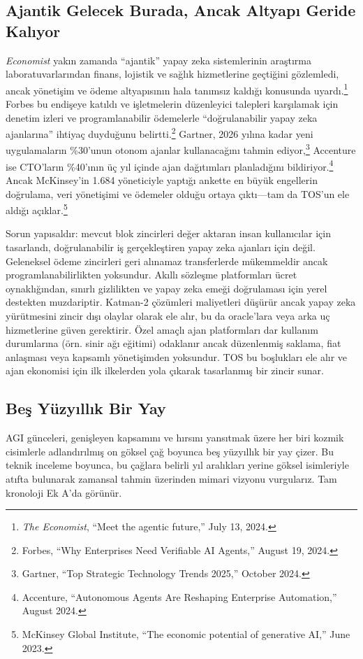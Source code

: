\documentclass[11pt]{article}
\begin{document}
\subsection{Ajantik Gelecek Burada, Ancak Altyapı Geride Kalıyor}
\emph{Economist} yakın zamanda ``ajantik'' yapay zeka sistemlerinin araştırma laboratuvarlarından finans, lojistik ve sağlık hizmetlerine geçtiğini gözlemledi, ancak yönetişim ve ödeme altyapısının hala tanımsız kaldığı konusunda uyardı.\footnote{\emph{The Economist}, ``Meet the agentic future,'' July 13, 2024.} Forbes bu endişeye katıldı ve işletmelerin düzenleyici talepleri karşılamak için denetim izleri ve programlanabilir ödemelerle ``doğrulanabilir yapay zeka ajanlarına'' ihtiyaç duyduğunu belirtti.\footnote{Forbes, ``Why Enterprises Need Verifiable AI Agents,'' August 19, 2024.} Gartner, 2026 yılına kadar yeni uygulamaların \%30'unun otonom ajanlar kullanacağını tahmin ediyor,\footnote{Gartner, ``Top Strategic Technology Trends 2025,'' October 2024.} Accenture ise CTO'ların \%40'ının üç yıl içinde ajan dağıtımları planladığını bildiriyor.\footnote{Accenture, ``Autonomous Agents Are Reshaping Enterprise Automation,'' August 2024.} Ancak McKinsey'in 1.684 yöneticiyle yaptığı ankette en büyük engellerin doğrulama, veri yönetişimi ve ödemeler olduğu ortaya çıktı---tam da TOS'un ele aldığı açıklar.\footnote{McKinsey Global Institute, ``The economic potential of generative AI,'' June 2023.}

Sorun yapısaldır: mevcut blok zincirleri değer aktaran insan kullanıcılar için tasarlandı, doğrulanabilir iş gerçekleştiren yapay zeka ajanları için değil. Geleneksel ödeme zincirleri geri alınamaz transferlerde mükemmeldir ancak programlanabilirlikten yoksundur. Akıllı sözleşme platformları ücret oynaklığından, sınırlı gizlilikten ve yapay zeka emeği doğrulaması için yerel destekten muzdariptir. Katman-2 çözümleri maliyetleri düşürür ancak yapay zeka yürütmesini zincir dışı olaylar olarak ele alır, bu da oracle'lara veya arka uç hizmetlerine güven gerektirir. Özel amaçlı ajan platformları dar kullanım durumlarına (örn. sinir ağı eğitimi) odaklanır ancak düzenlenmiş saklama, fiat anlaşması veya kapsamlı yönetişimden yoksundur. TOS bu boşlukları ele alır ve ajan ekonomisi için ilk ilkelerden yola çıkarak tasarlanmış bir zincir sunar.

\subsection{Beş Yüzyıllık Bir Yay}
AGI günceleri, genişleyen kapsamını ve hırsını yansıtmak üzere her biri kozmik cisimlerle adlandırılmış on göksel çağ boyunca beş yüzyıllık bir yay çizer. Bu teknik inceleme boyunca, bu çağlara belirli yıl aralıkları yerine göksel isimleriyle atıfta bulunarak zamansal tahmin üzerinden mimari vizyonu vurgularız. Tam kronoloji Ek A'da görünür.
\end{document}
